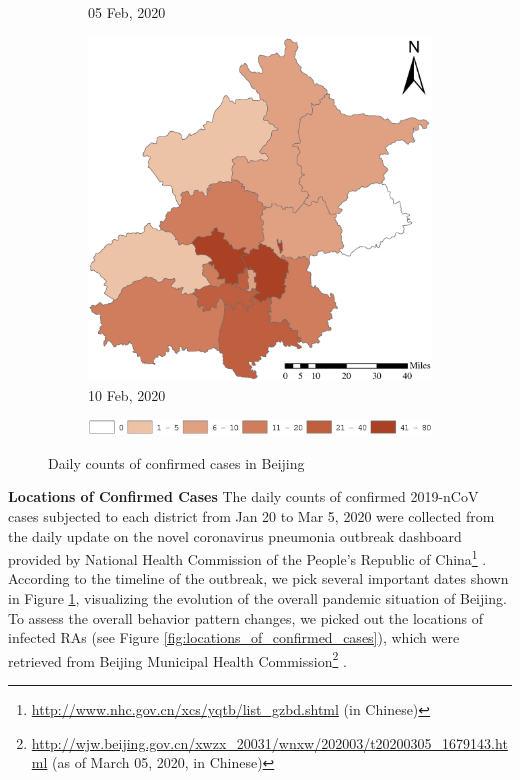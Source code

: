 \documentclass[preprints,ijgi,submit,moreauthors]{Definitions/mdpi}
\begin{document}
\begin{figure}[H]
\begin{subfigure}{.23\textwidth}
        \caption{05 Feb, 2020}
    \end{subfigure}
    \begin{subfigure}{.23\textwidth}
        \includegraphics[width=\textwidth]{Figures/ConfirmedDistrictD2020_02_10.eps}
        \caption{10 Feb, 2020}
    \end{subfigure}

    \vspace{6pt}
    \begin{subfigure}{0.7\textwidth}
        \includegraphics[width=\textwidth]{Figures/Fig2legend.eps}
    \end{subfigure}
    \caption{Daily counts of confirmed cases in Beijing}
    \label{fig:number_of_confirmed_cases}
\end{figure}

\textbf{Locations of Confirmed Cases}
The daily counts of confirmed 2019-nCoV cases subjected to each district from Jan 20 to Mar 5, 2020 were collected from the daily update on the novel coronavirus pneumonia outbreak dashboard provided by National Health Commission of the People's Republic of China\footnote{\url{http://www.nhc.gov.cn/xcs/yqtb/list_gzbd.shtml} (in Chinese)} .
According to the timeline \cite{li2020early} of the outbreak, we pick several important dates shown in Figure \ref{fig:number_of_confirmed_cases}, visualizing the evolution of the overall pandemic situation of Beijing.
To assess the overall behavior pattern changes, we picked out the locations of infected RAs (see Figure \ref{fig:locations_of_confirmed_cases}), which were retrieved from Beijing Municipal Health Commission\footnote{\url{http://wjw.beijing.gov.cn/xwzx_20031/wnxw/202003/t20200305_1679143.html} (as of March 05, 2020, in Chinese)} .  
\end{document}
